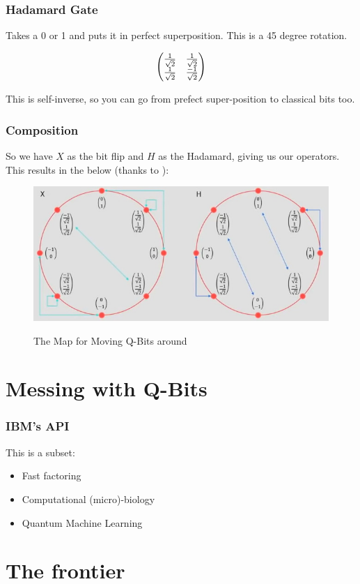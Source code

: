 \documentclass{beamer}
\begin{document}
\begin{frame}
\frametitle{Hadamard Gate}
Takes a 0 or 1 and puts it in perfect
superposition. This is a 45 degree
rotation.

\[
    \begin{pmatrix}
    {1 \over \sqrt{2}} & {1 \over \sqrt{2}}\\
    {1 \over \sqrt{2}} & {-1 \over \sqrt{2}}
    \end{pmatrix}
\]

This is self-inverse, so you can go from
prefect super-position to classical bits too.
\end{frame}

\begin{frame}
\frametitle{Composition}
So we have $X$ as the bit flip and
$H$ as the Hadamard, giving us our operators. This results in the below (thanks to \cite{img-blog}):
\begin{figure}
    \centering
    \includegraphics[width=.75\linewidth]{qt-unit-circle.jpg}
    \label{fig:qt-unit-circle}
    \caption{The Map for Moving Q-Bits around}
\end{figure}
\end{frame}

\section{Messing with Q-Bits}

\begin{frame}
\frametitle{IBM's API}
This is a subset:
\begin{itemize}
    \item Fast factoring
    \item Computational (micro)-biology
    \item Quantum Machine Learning
\end{itemize}
\end{frame}

\section{The frontier}
\end{document}
